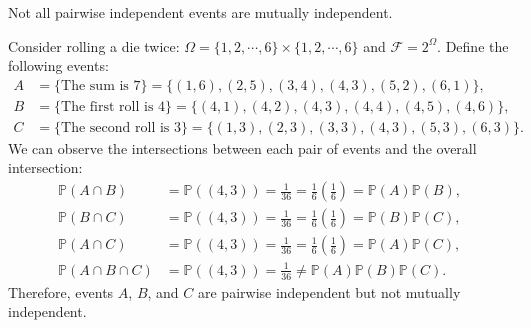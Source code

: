 \documentclass{huhtakm-template-book-v2}
\newcommand{\prob}{\mathbb{P}}
\begin{document}
    \begin{rem}
        Not all pairwise independent events are mutually independent.
    \end{rem}
    \begin{eg}
        Consider rolling a die twice: $\Omega = \{1,2,\cdots,6\}\times\{1,2,\cdots,6\}$ and $\mathcal{F} = 2^{\Omega}$. Define the following events:
        \begin{align*}
            A &= \{\text{The sum is }7\} = \{(1,6),(2,5),(3,4),(4,3),(5,2),(6,1)\},\\
            B &= \{\text{The first roll is }4\} = \{(4,1),(4,2),(4,3),(4,4),(4,5),(4,6)\},\\
            C &= \{\text{The second roll is }3\} = \{(1,3),(2,3),(3,3),(4,3),(5,3),(6,3)\}.
        \end{align*}
        We can observe the intersections between each pair of events and the overall intersection:
        \begin{align*}
            \prob(A\cap B) &= \prob((4,3)) = \frac{1}{36} = \frac{1}{6}\left(\frac{1}{6}\right) = \prob(A)\prob(B),\\
            \prob(B\cap C) &= \prob((4,3)) = \frac{1}{36} = \frac{1}{6}\left(\frac{1}{6}\right) = \prob(B)\prob(C),\\
            \prob(A\cap C) &= \prob((4,3)) = \frac{1}{36} = \frac{1}{6}\left(\frac{1}{6}\right) = \prob(A)\prob(C),\\
            \prob(A\cap B\cap C) &= \prob((4,3)) = \frac{1}{36} \neq \prob(A)\prob(B)\prob(C).
        \end{align*}
        Therefore, events $A$, $B$, and $C$ are pairwise independent but not mutually independent.
    \end{eg}
    \newpage
\end{document}
